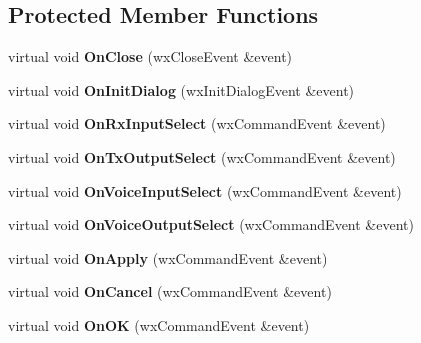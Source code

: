 \subsection*{Protected Member Functions}
\begin{DoxyCompactItemize}
\item 
\hypertarget{class_dlg_audio_a3d19dbabda45d63849c95f9202d9ee56}{virtual void {\bfseries On\-Close} (wx\-Close\-Event \&event)}\label{class_dlg_audio_a3d19dbabda45d63849c95f9202d9ee56}

\item 
\hypertarget{class_dlg_audio_a4005f4224055bd5c8767e9e4d2296c26}{virtual void {\bfseries On\-Init\-Dialog} (wx\-Init\-Dialog\-Event \&event)}\label{class_dlg_audio_a4005f4224055bd5c8767e9e4d2296c26}

\item 
\hypertarget{class_dlg_audio_a6981a966c4e04931511d9a0fad482591}{virtual void {\bfseries On\-Rx\-Input\-Select} (wx\-Command\-Event \&event)}\label{class_dlg_audio_a6981a966c4e04931511d9a0fad482591}

\item 
\hypertarget{class_dlg_audio_a2da73ea801464d515f0b4ea01dec3aeb}{virtual void {\bfseries On\-Tx\-Output\-Select} (wx\-Command\-Event \&event)}\label{class_dlg_audio_a2da73ea801464d515f0b4ea01dec3aeb}

\item 
\hypertarget{class_dlg_audio_a9c9848d90d805216ad52aad9443bffd8}{virtual void {\bfseries On\-Voice\-Input\-Select} (wx\-Command\-Event \&event)}\label{class_dlg_audio_a9c9848d90d805216ad52aad9443bffd8}

\item 
\hypertarget{class_dlg_audio_a337f1badd157dcdb9950e14033527f4a}{virtual void {\bfseries On\-Voice\-Output\-Select} (wx\-Command\-Event \&event)}\label{class_dlg_audio_a337f1badd157dcdb9950e14033527f4a}

\item 
\hypertarget{class_dlg_audio_a245e1317e52c8eeced77fcff2e6e2812}{virtual void {\bfseries On\-Apply} (wx\-Command\-Event \&event)}\label{class_dlg_audio_a245e1317e52c8eeced77fcff2e6e2812}

\item 
\hypertarget{class_dlg_audio_a68cb1a16f03fbb7af8d6ac0e7d5ba686}{virtual void {\bfseries On\-Cancel} (wx\-Command\-Event \&event)}\label{class_dlg_audio_a68cb1a16f03fbb7af8d6ac0e7d5ba686}

\item 
\hypertarget{class_dlg_audio_a86b960dabc5dae9f8cf4946d562330bd}{virtual void {\bfseries On\-O\-K} (wx\-Command\-Event \&event)}\label{class_dlg_audio_a86b960dabc5dae9f8cf4946d562330bd}

\end{DoxyCompactItemize}
